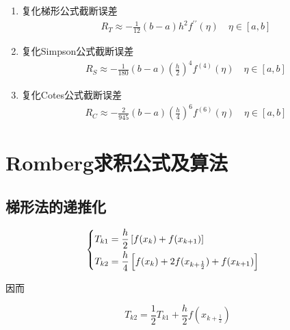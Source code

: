 \documentclass[12pt]{report}
\begin{document}
\begin{enumerate}
	\item 复化梯形公式截断误差
	\begin{equation} \tag{3.11} \label{3.11}
		\begin{aligned}
			R_T \approx -\frac{1}{12}(b - a)h^2 f^{\prime \prime} (\eta) \quad \eta \in [a, b]
		\end{aligned}
	\end{equation}

	\item 复化Simpson公式截断误差
	\begin{equation} \tag{3.12} \label{3.12}
		\begin{aligned}
			R_S \approx -\frac{1}{180}(b - a)\left(\frac{h}{2}\right)^4 f^{(4)}(\eta) \quad \eta \in [a, b]
		\end{aligned}
	\end{equation}

	\item 复化Cotes公式截断误差
	\begin{equation} \tag{3.13} \label{3.13}
		\begin{aligned}
			R_C \approx -\frac{2}{945}(b - a)\left(\frac{h}{4}\right)^6 f^{(6)}(\eta) \quad \eta \in [a, b]
		\end{aligned}
	\end{equation}
\end{enumerate}

\section{Romberg求积公式及算法}

\subsection{梯形法的递推化}

\begin{equation}
	\begin{cases}
		\begin{aligned}
			T_{k1} &= \frac{h}{2} \left[f(x_k) + f(x_{k+1})\right] \\
			T_{k2} &= \frac{h}{4} \left[f(x_k) + 2f(x_{k+\frac{1}{2}}) + f(x_{k+1})\right]
		\end{aligned}
	\end{cases}
	\notag
\end{equation}

因而

\[
T_{k2} = \frac{1}{2} T_{k1} + \frac{h}{2} f(x_{k+ \frac{1}{2}})
\]
\end{document}
